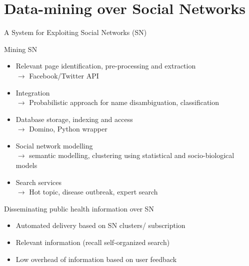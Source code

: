 \documentclass{beamer}
\begin{document}
\section{Data-mining over Social Networks}
\begin{frame}[t]{A System for Exploiting Social Networks (SN)}	
\begin{block}{Mining SN}
\begin{itemize}
\item  \small Relevant page \alert{identification, pre-processing and extraction}\\
$\rightarrow$  \scriptsize Facebook/Twitter API
\item  \small \alert{Integration}\\ 
$\rightarrow$  \scriptsize  Probabilistic approach for name disambiguation, classification
\item  \small Database \alert{storage,  indexing and access}\\
$\rightarrow$  \scriptsize Domino, Python wrapper
\item \small Social network \alert{modelling}\\ 
$\rightarrow$  \scriptsize semantic modelling, clustering using statistical and socio-biological models
\item \small \alert{Search} services\\
$\rightarrow$ \scriptsize Hot topic, disease outbreak, expert search 
\end{itemize}
\end{block}
  	
\begin{block}{Disseminating public health information over SN}
\begin{itemize}
\item \small \alert{Automated delivery} based on SN clusters/ subscription
\item \small \alert{Relevant} information (recall self-organized search)
\item \small \alert{Low overhead} of information based on user feedback
\end{itemize}
\end{block}
  	
\end{frame}

\end{document}
